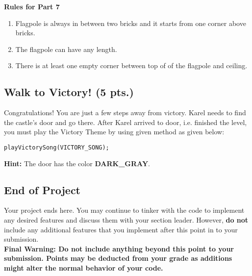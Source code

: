 \documentclass[a4paper]{article}
\begin{document}

\textbf{Rules for Part 7}
\begin{enumerate}
\item Flagpole is always in between two bricks and it starts from one corner above bricks.
\item The flagpole can have any length.
\item There is at least one empty corner between top of of the flagpole and ceiling.
\end{enumerate}


\subsection{Walk to Victory! (5 pts.)}
Congratulations! You are just a few steps away from victory. 
Karel needs to find the castle's door and go there. After Karel arrived to door, i.e. finished the level, you must play the Victory Theme by using given method as given below:

\begin{lstlisting} 
playVictorySong(VICTORY_SONG);
\end{lstlisting} 


\textbf{Hint:} The door has the color \textbf{DARK\_GRAY}.



\subsection{End of Project}
Your project ends here. You may continue to tinker with the code to implement any desired features and discuss them with your section leader. However, \textbf{do not} include any additional features that you implement after this point in to your submission.  
\\

\noindent \textbf{Final Warning: Do not include anything beyond this point to your submission. Points may be deducted from your grade as additions might alter the normal behavior of your code.} 
\end{document}
